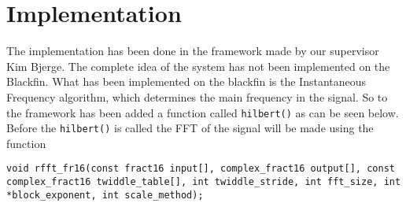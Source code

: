 
\section{Implementation}
\label{sec:impl}
The implementation has been done in the framework made by our supervisor Kim Bjerge.
The complete idea of the system has not been implemented on the Blackfin.
What has been implemented on the blackfin is the Instantaneous Frequency algorithm, which determines the main frequency in the signal.
So to the framework has been added a function called \texttt{hilbert()} as can be seen below.
Before the \texttt{hilbert()} is called the FFT of the signal will be made using the function 

\begin{verbatim}
void rfft_fr16(const fract16 input[], complex_fract16 output[], const complex_fract16 twiddle_table[], int twiddle_stride, int fft_size, int *block_exponent, int scale_method);
\end{verbatim}

